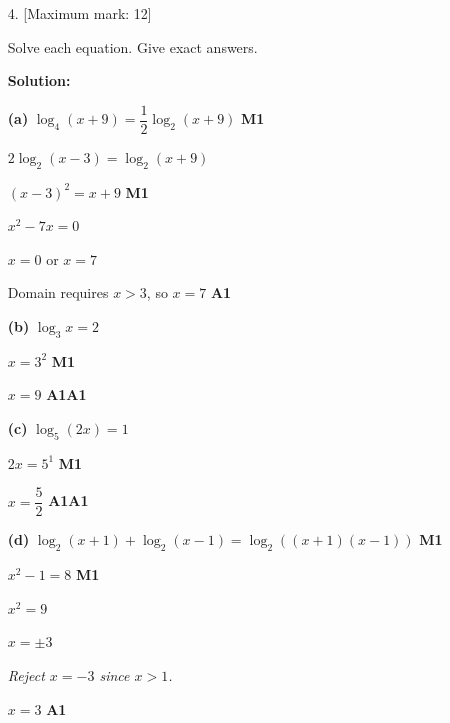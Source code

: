 \documentclass[12pt, twoside]{article}
\begin{document}
\begin{enumerate}[itemsep=0.3cm]
\medskip

\textbf{(b)} Write each expression as a single logarithm. \hfill [6]

\textbf{Solution:}

\textbf{(i)} $\log_2 x + \log_2 y = \log_2(xy)$ \hfill \textbf{M1A1}

\medskip

\textbf{(ii)}
$2\log_7 a - \log_7 b = \log_7 a^2 - \log_7 b$ \hfill \textbf{M1}

$= \log_7\!\left(\dfrac{a^2}{b}\right)$ \hfill \textbf{A1}

\medskip

\textbf{(iii)}
$\dfrac{1}{2}\ln p + \ln q = \ln p^{1/2} + \ln q$ \hfill \textbf{M1}

$= \ln(q\sqrt{p})$ \hfill \textbf{A1}

\emph{Accept $\ln(\sqrt{p}\,q)$ or $\ln(p^{1/2}q)$.}

\newpage

\item[4.] [Maximum mark: 12]

Solve each equation. Give exact answers.

\textbf{Solution:}

\textbf{(a)} $\log_4(x + 9) = \dfrac{1}{2}\log_2(x + 9)$ \hfill \textbf{M1}

$2\log_2(x - 3) = \log_2(x + 9)$

$(x - 3)^2 = x + 9$ \hfill \textbf{M1}

$x^2 - 7x = 0$

$x = 0$ or $x = 7$

Domain requires $x > 3$, so $x = 7$ \hfill \textbf{A1}

\medskip

\textbf{(b)} $\log_3 x = 2$

$x = 3^2$ \hfill \textbf{M1}

$x = 9$ \hfill \textbf{A1A1}

\medskip

\textbf{(c)} $\log_5(2x) = 1$

$2x = 5^1$ \hfill \textbf{M1}

$x = \dfrac{5}{2}$ \hfill \textbf{A1A1}

\medskip

\textbf{(d)}
$\log_2(x + 1) + \log_2(x - 1) = \log_2((x + 1)(x - 1))$ \hfill \textbf{M1}

$x^2 - 1 = 8$ \hfill \textbf{M1}

$x^2 = 9$

$x = \pm 3$ 

\emph{Reject $x = -3$ since $x > 1$.}

$x = 3$ \hfill \textbf{A1}


\end{enumerate}
\end{document}
